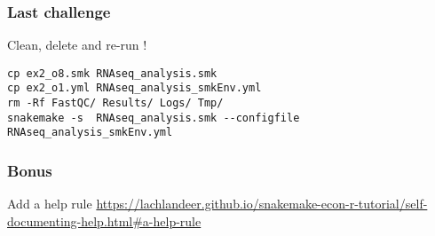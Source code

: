 \begin{frame}[containsverbatim]
\frametitle{Last challenge}
\begin{exampleblock}{}
Clean, delete and re-run !
\begin{lstlisting}
cp ex2_o8.smk RNAseq_analysis.smk
cp ex2_o1.yml RNAseq_analysis_smkEnv.yml
rm -Rf FastQC/ Results/ Logs/ Tmp/ 
snakemake -s  RNAseq_analysis.smk --configfile RNAseq_analysis_smkEnv.yml
\end{lstlisting}
\end{exampleblock}
\end{frame}
\begin{frame}[containsverbatim]
\frametitle{Bonus}
\begin{exampleblock}{Add a help rule}
\url{https://lachlandeer.github.io/snakemake-econ-r-tutorial/self-documenting-help.html#a-help-rule}
\end{exampleblock}
\end{frame}
